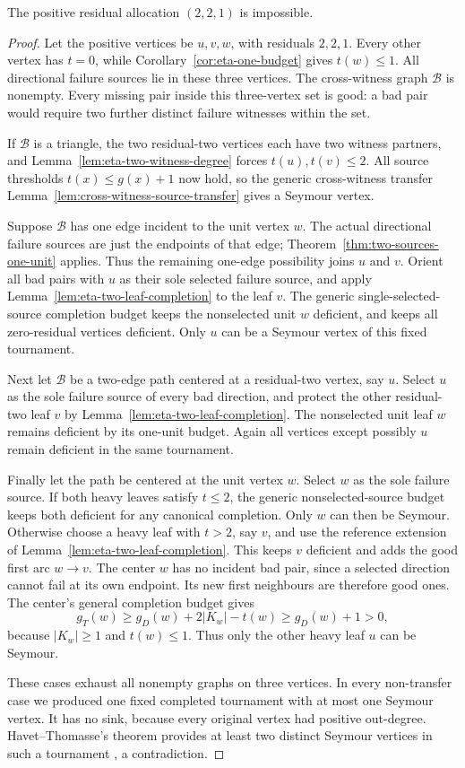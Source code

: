 \begin{theorem}\label{thm:no-two-two-one}
The positive residual allocation $(2,2,1)$ is impossible.
\end{theorem}
\begin{proof}
Let the positive vertices be $u,v,w$, with residuals $2,2,1$.
Every other vertex has $t=0$, while
Corollary~\ref{cor:eta-one-budget} gives $t(w)\le1$.
All directional failure sources lie in these three vertices.
The cross-witness graph $\mathcal B$ is nonempty.
Every missing pair inside this three-vertex set is good: a bad pair
would require two further distinct failure witnesses within the set.

If $\mathcal B$ is a triangle, the two residual-two vertices each have
two witness partners, and Lemma~\ref{lem:eta-two-witness-degree}
forces $t(u),t(v)\le2$. All source thresholds
$t(x)\le g(x)+1$ now hold, so the generic cross-witness transfer
Lemma~\ref{lem:cross-witness-source-transfer} gives a Seymour vertex.

Suppose $\mathcal B$ has one edge incident to the unit vertex $w$.
The actual directional failure sources are just the endpoints of
that edge; Theorem~\ref{thm:two-sources-one-unit} applies.
Thus the remaining one-edge possibility joins $u$ and $v$.
Orient all bad pairs with $u$ as their sole selected failure source,
and apply Lemma~\ref{lem:eta-two-leaf-completion} to the leaf $v$.
The generic single-selected-source completion budget keeps the
nonselected unit $w$ deficient, and keeps all zero-residual vertices
deficient. Only $u$ can be a Seymour vertex of this fixed tournament.

Next let $\mathcal B$ be a two-edge path centered at a residual-two
vertex, say $u$. Select $u$ as the sole failure source of every bad
direction, and protect the other residual-two leaf $v$ by
Lemma~\ref{lem:eta-two-leaf-completion}. The nonselected unit leaf
$w$ remains deficient by its one-unit budget. Again all vertices
except possibly $u$ remain deficient in the same tournament.

Finally let the path be centered at the unit vertex $w$. Select $w$
as the sole failure source. If both heavy leaves satisfy $t\le2$,
the generic nonselected-source budget keeps both deficient for any
canonical completion. Only $w$ can then be Seymour.
Otherwise choose a heavy leaf with $t>2$, say $v$, and use the
reference extension of Lemma~\ref{lem:eta-two-leaf-completion}.
This keeps $v$ deficient and adds the good first arc $w\to v$.
The center $w$ has no incident bad pair, since a selected direction
cannot fail at its own endpoint. Its new first neighbours are
therefore good ones. The center's general completion budget gives
\[
 g_T(w)\ge g_D(w)+2|K_w|-t(w)\ge g_D(w)+1>0,
\]
because $|K_w|\ge1$ and $t(w)\le1$.
Thus only the other heavy leaf $u$ can be Seymour.

These cases exhaust all nonempty graphs on three vertices.
In every non-transfer case we produced one fixed completed tournament
with at most one Seymour vertex. It has no sink, because every
original vertex had positive out-degree. Havet--Thomasse's theorem
provides at least two distinct Seymour vertices in such a tournament
\cite[Theorem~2]{HavetThomasse2000}, a contradiction.
\end{proof}
